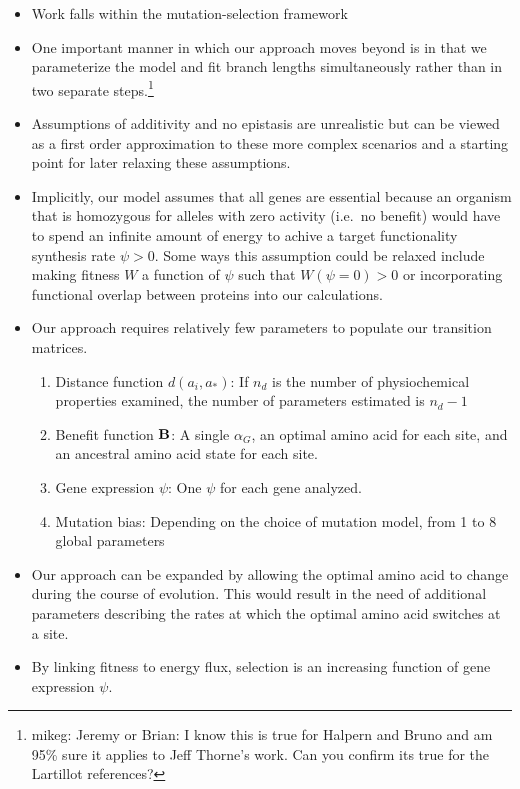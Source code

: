 \documentclass{article}
\newcommand{\Func}{\ensuremath{\text{\textbf{B}}}\xspace}
\newcommand{\aopt}{\ensuremath{a_*}\xspace}
\begin{document}
\begin{itemize}
\item Work falls within the mutation-selection framework
\item One important manner in which our approach moves beyond \citet{HalpernAndBruno1998,RobinsonEtAl2003,LartillotAndPhilippe2004,ThorneEtAl2012,RodrigueAndLartillot2014} is in that we parameterize the model and fit branch lengths simultaneously rather than in two separate steps.\footnote{mikeg: Jeremy or Brian: I know this is true for Halpern and Bruno and am 95\% sure it applies to Jeff Thorne's work.
Can you confirm its true for the Lartillot references?}
\item Assumptions of additivity and no epistasis are unrealistic but can be viewed as a first order approximation to these more complex scenarios and a starting point for later relaxing these assumptions.
\item Implicitly, our model assumes that all genes are essential because an organism that is homozygous for alleles with zero activity (i.e.~no benefit) would have to spend an infinite amount of energy to achive a target functionality synthesis rate $\psi > 0$.
  Some ways this assumption could be relaxed include making fitness $W$ a function of $\psi$ such that  $W(\psi = 0) > 0$ or incorporating functional overlap between proteins into our calculations.
\item Our approach requires relatively few parameters to populate our transition matrices. 
  \begin{enumerate}
  \item Distance function $d(a_i, \aopt)$: If $n_d$ is the number of physiochemical properties examined, the number of parameters estimated is $n_d - 1$
  \item Benefit function $\Func$: A single $\alpha_G$, an optimal amino acid for each site, and an ancestral amino acid state for each site. 
  \item Gene expression $\psi$: One $\psi$ for each gene analyzed.
  \item Mutation bias: Depending on the choice of mutation model, from 1 to 8 global parameters 
  \end{enumerate}
\item Our approach can be expanded by allowing the optimal amino acid to change during the course of evolution.
This would result in the need of additional parameters describing the rates at which the optimal amino acid switches at a site.
\item By linking fitness to energy flux, selection is an increasing function of gene expression $\psi$.

\end{itemize}
\end{document}
